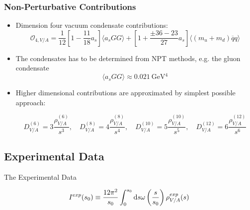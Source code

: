 \documentclass{beamer}
\begin{document}
\begin{frame}
  \frametitle{Non-Perturbative Contributions}
  \begin{itemize}
  \item Dimension four vacuum condensate contributions:
    \begin{equation}
      \mathcal{O}_{4,V/A} = \frac{1}{12}\left[ 1 - \frac{11}{18}a_s \right] \langle  a_s GG \rangle
      + \left[ 1 + \frac{\pm 36 - 23}{27} a_s \right] \langle (m_u + m_d) \overline{q}q \rangle
    \end{equation}
  \item The condensates has to be determined from NPT methods, e.g. the gluon
    condensate
    \begin{equation}
      \langle a_s GG \rangle \approx \SI{0.021}{\giga\eV^4}
    \end{equation}
  \item Higher dimensional contributions are approximated by simplest possible
    approach:
    \begin{small}
      \begin{equation}
        D_{V/A}^{(6)} = 3 \frac{\rho_{V/A}^{(6)}}{s^3}, \quad
        D_{V/A}^{(8)} = 4 \frac{\rho_{V/A}^{(8)}}{s^4}, \quad
        D_{V/A}^{(10)} = 5 \frac{\rho_{V/A}^{(10)}}{s^5}, \quad
        D_{V/A}^{(12)} = 6 \frac{\rho_{V/A}^{(12)}}{s^6}
      \end{equation}
    \end{small}
  \end{itemize}
\end{frame}


\subsection{Experimental Data}
\begin{frame}
  \centering \vspace{0.5cm}
  \begin{LARGE}
    The Experimental Data
  \end{LARGE}
  \begin{equation}
    I^{exp}(s_0) \equiv \frac{12 \pi^2}{s_0} \int_0^{s_0} \dif s \omega\left(\frac{s}{s_0}\right) \rho^{exp}_{V/A}(s)
  \end{equation}
\end{frame}
\end{document}
